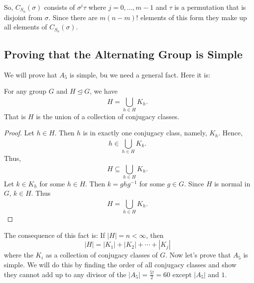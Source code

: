 So, \( {C}_{{S}_{n}}(\sigma) \) consists of \( \sigma^{i} \tau  \) where \( j = 0 , \dots, m - 1  \) and \( \tau  \) is a permutation that is disjoint from \( \sigma \). Since there are \( m (n-m)! \)  elements of this form they make up all elements of \( {C}_{{S}_{n}}(\sigma) \).

\subsection{Proving that the Alternating Group is Simple}

We will prove hat \( {A}_{5} \) is simple, bu we need a general fact. Here it is:
\begin{prop}
    For any group \( G  \) and \( H \trianglelefteq G  \), we have 
    \[  H = \bigcup_{ h \in H  }^{   }  {K}_{h}. \]
    That is \( H  \) is the union of a collection of conjugacy classes.
\end{prop}
\begin{proof}
Let \( h \in H  \). Then \( h  \) is in exactly one conjugacy class, namely, \({K}_{h} \). Hence,   
\[  h \in \bigcup_{ h \in H  }^{  }  {K}_{k }. \]
Thus, 
\[  H \subseteq  \bigcup_{ h \in H  }^{  }  {K}_{h}. \]
Let \( k \in {K}_{h} \) for some \( h \in H  \). Then \( k = g h g^{-1} \) for some \( g \in G  \). Since \( H  \) is normal in \( G  \), \( k \in H  \). Thus 
\[  H = \bigcup_{  h \in H  }^{   }  {K}_{h}. \]
\end{proof}

The consequence of this fact is: If \( |  H  | = n  < \infty   \), then 
\[  | H  |  = |{K}_{1}| + |{K}_{2}| + \cdots + |{K}_{j}| \]
where the \( {K}_{i} \) as a collection of conjugacy classes of \( G  \). Now let's prove that \( {A}_{5} \) is simple. We will do this by finding the order of all conjugacy classes and show they cannot add up to any divisor of the \( | {A}_{5} | = \frac{ 5 !  }{  2  }  = 60   \) except \( | {A}_{5} |   \) and \( 1  \).     

